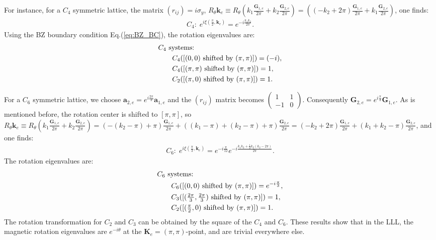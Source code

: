 \begin{subappendices}
    For instance, for a $C_4$ symmetric lattice, the matrix $(r_{ij})=i\sigma_y$, $R_{\theta}\mathbf{k}_e\equiv R_\theta(k_1 \frac{\mathbf G_{1,e}}{2\pi} + k_2 \frac{\mathbf G_{2,e}}{2\pi})=((-k_2+2\pi) \frac{\mathbf G_{1,e}}{2\pi} + k_1 \frac{\mathbf G_{2,e}}{2\pi})$, one finds:
    \begin{align}
        C_4:\; e^{i\xi(\frac{\pi}{2},\mathbf k_e)}=e^{-i \frac{k_1 k_2}{2\pi}}.
    \end{align}
    Using the BZ boundary condition Eq.(\ref{eq:BZ_BC}), the rotation eigenvalues are:
    \begin{align}
         & C_4 \text{ systems: }\notag                                      \\
         & \quad\quad C_4([(0,0)\text{ shifted by }(\pi,\pi)])=(-i), \notag \\
         & \quad\quad C_4([(\pi,\pi)\text{ shifted by }(\pi,\pi)])=1,\notag \\
         & \quad\quad C_2([(\pi,0)\text{ shifted by }(\pi,\pi)])=1.
    \end{align}

    For a $C_6$ symmetric lattice, we choose $\mathbf a_{2,e}=e^{i\frac{2\pi}{3}}\mathbf a_{1,e}$ and the $(r_{ij})$ matrix becomes $\begin{pmatrix} 1& 1 \\ -1 & 0\end{pmatrix}$. Consequently $\mathbf G_{2,e}=e^{i\frac{\pi}{3}}\mathbf G_{1,e}$. As is mentioned before, the rotation center is shifted to $[\pi,\pi]$, so $R_\theta\mathbf k_e\equiv R_{\theta} (k_1 \frac{\mathbf G_{1,e}}{2\pi} + k_2 \frac{\mathbf G_{2,e}}{2\pi})=(-(k_2-\pi)+\pi) \frac{\mathbf G_{1,e}}{2\pi} + ((k_1-\pi)+(k_2-\pi)+\pi) \frac{\mathbf G_{2,e}}{2\pi}=(-k_2+2\pi) \frac{\mathbf G_{1,e}}{2\pi} + (k_1+k_2-\pi) \frac{\mathbf G_{2,e}}{2\pi}$, and one finds:
    \begin{align}
        C_6:\; e^{i\xi(\frac{\pi}{3},\mathbf k_e)}=e^{-i\frac{\pi}{12}}e^{-i \frac{k_1 k_2+\frac{1}{2}k_2(k_2-2\pi)}{2\pi}}.
    \end{align}
    The rotation eigenvalues are:
    \begin{align}
         & C_6\text{ systems: }\notag                                                               \\
         & \quad\quad C_6([(0,0)\text{ shifted by }(\pi,\pi)])=e^{-i\frac{\pi}{3}},\notag           \\
         & \quad\quad C_3([(\tfrac{2\pi}{3},\tfrac{2\pi}{3})\text{ shifted by }(\pi,\pi)])=1,\notag \\
         & \quad\quad C_2([(\tfrac{\pi}{2},0)\text{ shifted by }(\pi,\pi)])=1.
    \end{align}
    The rotation transformation for $C_2$ and $C_3$ can be obtained by the square of the $C_4$ and $C_6$. These results show that in the LLL, the magnetic rotation eigenvalues are $e^{-i\theta}$ at the $\mathbf K_e=(\pi,\pi)$-point, and are trivial everywhere else.


\end{subappendices}
